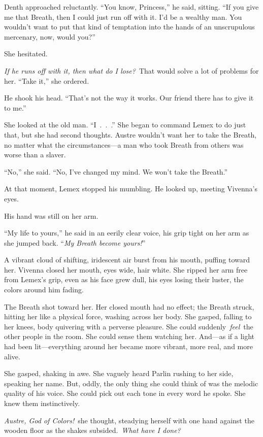 Denth approached reluctantly. “You know, Princess,” he said, sitting. “If you give me that Breath, then I could just run off with it. I’d be a wealthy man. You wouldn’t want to put that kind of temptation into the hands of an unscrupulous mercenary, now, would you?”

She hesitated.

\textit{If he runs off with it, then what do I lose?}~That would solve a lot of problems for her. “Take it,” she ordered.

He shook his head. “That’s not the way it works. Our friend there has to give it to me.”

She looked at the old man. “I~.~.~.” She began to command Lemex to do just that, but she had second thoughts. Austre wouldn’t want her to take the Breath, no matter what the circumstances—a man who took Breath from others was worse than a slaver.

“No,” she said. “No, I’ve changed my mind. We won’t take the Breath.”

At that moment, Lemex stopped his mumbling. He looked up, meeting Vivenna’s eyes.

His hand was still on her arm.

“My life to yours,” he said in an eerily clear voice, his grip tight on her arm as she jumped back. “\textit{My Breath become yours!}”

A vibrant cloud of shifting, iridescent air burst from his mouth, puffing toward her. Vivenna closed her mouth, eyes wide, hair white. She ripped her arm free from Lemex’s grip, even as his face grew dull, his eyes losing their luster, the colors around him fading.

The Breath shot toward her. Her closed mouth had no effect; the Breath struck, hitting her like a physical force, washing across her body. She gasped, falling to her knees, body quivering with a perverse pleasure. She could suddenly~\textit{feel}~the other people in the room. She could sense them watching her. And—as if a light had been lit—everything around her became more vibrant, more real, and more alive.

She gasped, shaking in awe. She vaguely heard Parlin rushing to her side, speaking her name. But, oddly, the only thing she could think of was the melodic quality of his voice. She could pick out each tone in every word he spoke. She knew them instinctively.

\textit{Austre, God of Colors!}~she thought, steadying herself with one hand against the wooden floor as the shakes subsided.~\textit{What have I done?}

